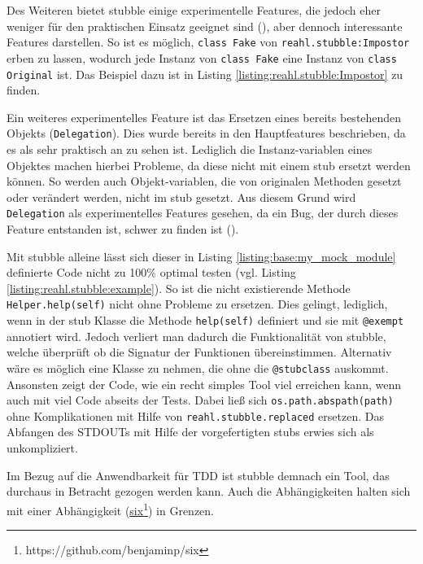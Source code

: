 Des Weiteren bietet stubble einige experimentelle Features, die jedoch eher
weniger für den praktischen Einsatz geeignet sind (\cite{reahl.stubble:4.0}),
aber dennoch interessante Features darstellen. So ist es möglich,
\lstinline{class Fake} von \lstinline{reahl.stubble:Impostor} erben zu lassen,
wodurch jede Instanz von \lstinline{class Fake} eine Instanz von
\lstinline{class Original} ist. Das Beispiel dazu ist in Listing
\ref{listing:reahl.stubble:Impostor} zu finden.

Ein weiteres experimentelles Feature ist das Ersetzen eines bereits bestehenden
Objekts (\lstinline{Delegation}). Dies wurde bereits in den Hauptfeatures
beschrieben, da es als sehr praktisch an zu sehen ist. Lediglich die
Instanz-variablen eines Objektes machen hierbei Probleme, da diese nicht mit
einem \Gls{stub} ersetzt werden können. So werden auch Objekt-variablen, die von
originalen Methoden gesetzt oder verändert werden, nicht im \Gls{stub} gesetzt.
Aus diesem Grund wird \lstinline{Delegation} als experimentelles Features
gesehen, da ein Bug, der durch dieses Feature entstanden ist, schwer zu finden
ist (\cite{reahl.stubble:4.0}).
\newline

Mit stubble alleine lässt sich dieser in Listing 
\ref{listing:base:my_mock_module} definierte Code nicht zu 100\% optimal testen
(vgl. Listing \ref{listing:reahl.stubble:example}). So ist die nicht
existierende Methode \lstinline{Helper.help(self)} nicht ohne Probleme zu
ersetzen. Dies gelingt, lediglich, wenn in der \Gls{stub} Klasse die Methode
\lstinline{help(self)} definiert und sie mit \lstinline{@exempt} annotiert
wird. Jedoch verliert man dadurch die Funktionalität von stubble, welche
überprüft ob die Signatur der Funktionen übereinstimmen. Alternativ wäre es
möglich eine Klasse zu nehmen, die ohne die \lstinline{@stubclass} auskommt.
Ansonsten zeigt der Code, wie ein recht simples Tool viel erreichen kann, wenn
auch mit viel Code abseits der Tests. Dabei ließ sich
\lstinline{os.path.abspath(path)} ohne Komplikationen mit Hilfe von
\lstinline{reahl.stubble.replaced} ersetzen. Das Abfangen des STDOUTs mit Hilfe
der vorgefertigten \Glspl{stub} erwies sich als unkompliziert.
\newline

Im Bezug auf die Anwendbarkeit für TDD ist stubble demnach ein Tool, das
durchaus in Betracht gezogen werden kann. Auch die Abhängigkeiten halten sich
mit einer Abhängigkeit
(\href{https://github.com/benjaminp/six}{six}\footnote{https://github.com/benjaminp/six})
in Grenzen.


